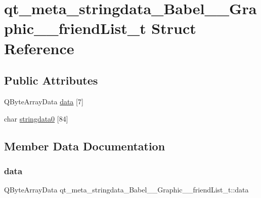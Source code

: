 \hypertarget{structqt__meta__stringdata__Babel____Graphic____friendList__t}{}\section{qt\+\_\+meta\+\_\+stringdata\+\_\+\+Babel\+\_\+\+\_\+\+Graphic\+\_\+\+\_\+friend\+List\+\_\+t Struct Reference}
\label{structqt__meta__stringdata__Babel____Graphic____friendList__t}
\subsection*{Public Attributes}
\begin{DoxyCompactItemize}
\item 
Q\+Byte\+Array\+Data \hyperlink{structqt__meta__stringdata__Babel____Graphic____friendList__t_a518e565ae5c8740142f9624225bfe7f1}{data} \mbox{[}7\mbox{]}
\item 
char \hyperlink{structqt__meta__stringdata__Babel____Graphic____friendList__t_a818fe8a8bc62ea0fac4e35426d1e30d7}{stringdata0} \mbox{[}84\mbox{]}
\end{DoxyCompactItemize}


\subsection{Member Data Documentation}
\mbox{\label{structqt__meta__stringdata__Babel____Graphic____friendList__t_a518e565ae5c8740142f9624225bfe7f1}} 
\subsubsection{\texorpdfstring{data}{data}}
{\footnotesize\ttfamily Q\+Byte\+Array\+Data qt\+\_\+meta\+\_\+stringdata\+\_\+\+Babel\+\_\+\+\_\+\+Graphic\+\_\+\+\_\+friend\+List\+\_\+t\+::data}

